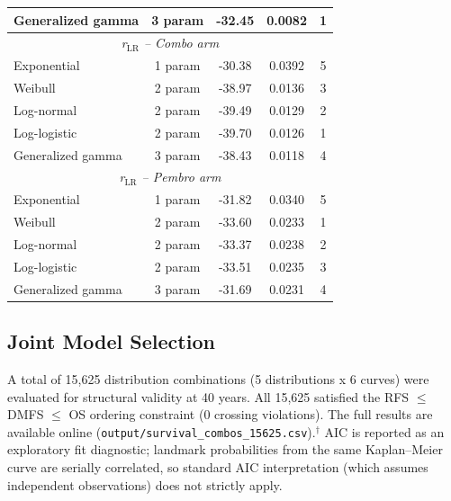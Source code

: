 \documentclass[11pt,a4paper]{article}
\begin{document}
\begin{table}[H]
\begin{tabular}{lcccc}
Generalized gamma & 3 param & -32.45 & 0.0082 & 1 \\
\midrule
\multicolumn{5}{c}{\textit{r$_{\text{LR}}$ -- Combo arm}} \\
Exponential & 1 param & -30.38 & 0.0392 & 5 \\
Weibull & 2 param & -38.97 & 0.0136 & 3 \\
Log-normal & 2 param & -39.49 & 0.0129 & 2 \\
Log-logistic & 2 param & -39.70 & 0.0126 & 1 \\
Generalized gamma & 3 param & -38.43 & 0.0118 & 4 \\
\midrule
\multicolumn{5}{c}{\textit{r$_{\text{LR}}$ -- Pembro arm}} \\
Exponential & 1 param & -31.82 & 0.0340 & 5 \\
Weibull & 2 param & -33.60 & 0.0233 & 1 \\
Log-normal & 2 param & -33.37 & 0.0238 & 2 \\
Log-logistic & 2 param & -33.51 & 0.0235 & 3 \\
Generalized gamma & 3 param & -31.69 & 0.0231 & 4 \\
\bottomrule
\end{tabular}
\end{table}

\subsection{Joint Model Selection}
\label{sec:joint}
A total of 15,625 distribution combinations (5 distributions x 6 curves) were evaluated for structural validity at 40 years. All 15,625 satisfied the RFS $\leq$ DMFS $\leq$ OS ordering constraint (0 crossing violations). The full results are available online (\texttt{output/survival\_combos\_15625.csv}).$^{\dagger}$ AIC is reported as an exploratory fit diagnostic; landmark probabilities from the same Kaplan--Meier curve are serially correlated, so standard AIC interpretation (which assumes independent observations) does not strictly apply.
\end{document}
